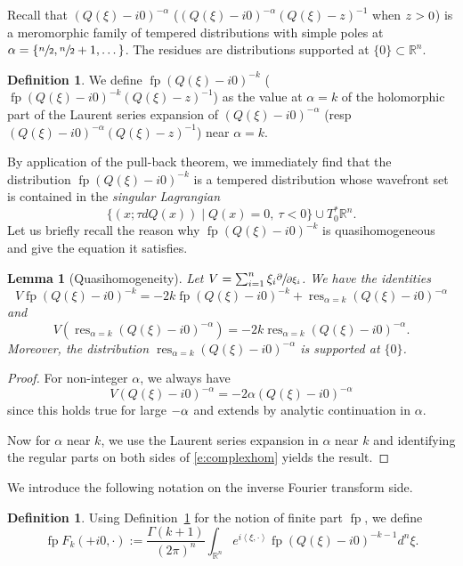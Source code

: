 \documentclass[JEP,XML,SOM,Unicode]{cedram}
\newtheorem{lemma}[theorem]{Lemma}
\theoremstyle{definition}
\newtheorem{definition}[theorem]{Definition}
\let\cv\alpha
\let\st\mid
\let\Feuler V
\let\Im\relax
\let\Re\relax
\DeclareMathOperator{\Im}{Im}
\DeclareMathOperator{\Re}{Re}
\DeclareMathOperator*{\pf}{fp}
\DeclareMathOperator*{\res}{res}
\begin{document}
Recall that {$(Q(\xi)-i0)^{-\cv}$} (\resp $ (Q(\xi)-i0)^{-\cv} (Q(\xi)-z)^{-1} $ when $\Im z>0$) is a meromorphic family of tempered distributions with simple poles at \hbox{$\cv=\{\sfrac{n}{2},\sfrac{n}{2}+1,\dots \}$}. The residues are distributions supported at $\{0\}\subset \mathbb{R}^n$.

\begin{definition}\label{d:finitepart}
We define $\pf(Q(\xi)-i0)^{-k}$ {(\resp $ \pf (Q(\xi)-i0)^{-k} (Q(\xi)-z)^{-1} $)} as the value at $\cv=k$ of the holomorphic part of the Laurent series expansion of
$(Q(\xi)-i0)^{-\cv}$ (resp $ (Q(\xi)-i0)^{-\cv} (Q(\xi)-z)^{-1} $) near $\cv=k$.
\end{definition}

By application of the pull-back theorem, we immediately find that
the distribution $\pf (Q(\xi)-i0)^{-k}$ is a tempered distribution
whose wavefront set is contained in the
\emph{singular Lagrangian}
\[
\{(x;\tau dQ(x)) \st Q(x)=0, \ \tau < 0 \}\cup T^*_0\mathbb{R}^n.
\]
Let us briefly recall the reason why
$\pf(Q(\xi)-i0)^{-k}$ is quasihomogeneous and
give the equation it satisfies.
\begin{lemma}[Quasihomogeneity]
Let $\Feuler=\sum_{i=1}^n\xi_i\sfrac{\partial}{\partial \xi_i}$. We have the identities
\[
{\Feuler} \pf(Q(\xi)-i0)^{-k}=-2k\pf(Q(\xi)-i0)^{-k}+\res_{\cv=k}(Q(\xi)-i0)^{-\cv}
\]
and
\[
{\Feuler}(\res_{\cv=k}(Q(\xi)-i0)^{-\cv})=-2k\res_{\cv=k}(Q(\xi)-i0)^{-\cv}.
\]
Moreover, the distribution $\res_{\cv=k}(Q(\xi)-i0)^{-\cv}$ is supported at $\{0\}$.
\end{lemma}

\begin{proof}
For non-integer $\cv$, we always have
\begin{equation}\label{e:complexhom}
{\Feuler}(Q(\xi)-i0)^{-\cv}=-2\cv (Q(\xi)-i0)^{-\cv}
\end{equation}
since this holds true for large $-\Re\cv$ and
extends by analytic continuation in $\cv$.

Now for $\cv$ near $k$, we use the Laurent series expansion in $\cv$ near $k$ and identifying the regular parts on both sides of \eqref{e:complexhom} yields the result.
\end{proof}

We introduce the following notation on the inverse Fourier transform side.

\begin{definition}
Using Definition~\ref{d:finitepart} for the notion of finite part $\pf$, we define
\[
\pf F_k(+i0,\cdot):= \frac{\Gamma(k+1)}{(2\pi)^n} \int_{\mathbb{R}^n} e^{i \left\langle \xi,\cdot \right\rangle} \pf(Q(\xi)-i0)^{-k-1} d^n\xi.
\]
\end{definition}
\end{document}
